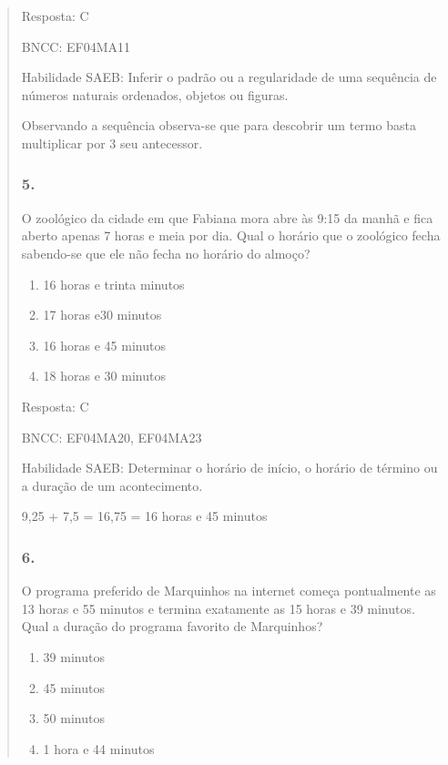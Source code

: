 \begin{enumerate}
\begin{escolha}
\begin{enumerate}
\begin{itemize}
\begin{itemize}
\begin{escolha}
\begin{quote}
\begin{escolha}
{Resposta: C

BNCC: EF04MA11

Habilidade SAEB: Inferir o padrão ou a regularidade de uma sequência de
números naturais ordenados, objetos ou figuras.

Observando a sequência observa-se que para descobrir um termo basta
multiplicar por 3 seu antecessor.

\subsubsection{5.}\label{section-176}

O zoológico da cidade em que Fabiana mora abre às 9:15 da manhã e fica
aberto apenas 7 horas e meia por dia. Qual o horário que o zoológico
fecha sabendo-se que ele não fecha no horário do almoço?

\begin{enumerate}
\def\labelenumi{\alph{enumi})}
\item
  16 horas e trinta minutos
\item
  17 horas e30 minutos
\item
  16 horas e 45 minutos
\item
  18 horas e 30 minutos
\end{enumerate}

Resposta: C

BNCC: EF04MA20, EF04MA23

Habilidade SAEB: Determinar o horário de início, o horário de término ou
a duração de um acontecimento.

9,25 + 7,5 = 16,75 = 16 horas e 45 minutos

\subsubsection{6.}\label{section-177}

O programa preferido de Marquinhos na internet começa pontualmente as 13
horas e 55 minutos e termina exatamente as 15 horas e 39 minutos. Qual a
duração do programa favorito de Marquinhos?

\begin{enumerate}
\def\labelenumi{\alph{enumi})}
\item
  39 minutos
\item
  45 minutos
\item
  50 minutos
\item
  1 hora e 44 minutos
\end{enumerate}

}
\end{escolha}
\end{quote}
\end{escolha}
\end{itemize}
\end{itemize}
\end{enumerate}
\end{escolha}
\end{enumerate}
